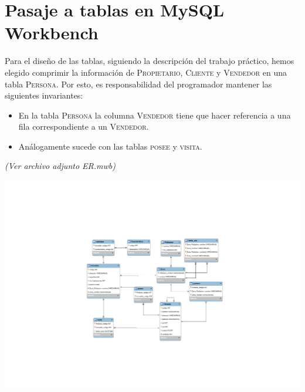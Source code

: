 \documentclass[12pt]{article}
\begin{document}
\newpage
\section{Pasaje a tablas en MySQL Workbench}
Para el diseño de las tablas, siguiendo la descripción del trabajo práctico, hemos elegido comprimir la información de \textsc{Propietario}, \textsc{Cliente} y \textsc{Vendedor} en una tabla \textsc{Persona}. Por esto, es responsabilidad del programador mantener las siguientes invariantes:

\begin{itemize}
\item
En la tabla \textsc{Persona} la columna \textsc{Vendedor} tiene que hacer referencia a una fila correspondiente a un \textsc{Vendedor}.
\item
Análogamente sucede con las tablas \textsc{posee} y \textsc{visita}.
\end{itemize}

\textit{(Ver archivo adjunto ER.mwb)}

\includegraphics[width=\textwidth]{ER.pdf}
\end{document}

